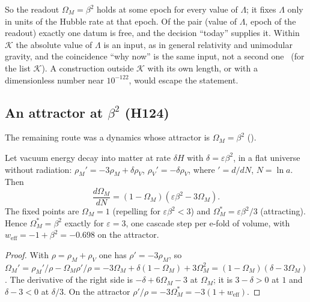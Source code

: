 So the readout $\Omega_M=\beta^2$ holds at some epoch for every value of $\Lambda$; it fixes $\Lambda$ only in units of the Hubble rate at that
epoch.  Of the pair (value of $\Lambda$, epoch of the readout) exactly one datum is free, and the decision ``today'' supplies it.  Within $\mathcal K$
the absolute value of $\Lambda$ is an input, as in general relativity and unimodular gravity, and the coincidence ``why now'' is the same input, not
a second one \Established\ (for the list $\mathcal K$).  A construction outside $\mathcal K$ with its own length, or with a dimensionless number near
$10^{-122}$, would escape the statement.

\subsection{An attractor at \texorpdfstring{$\beta^2$}{beta squared} (H124)}
\label{sec:lop5-attractor}

The remaining route was a dynamics whose attractor is $\Omega_M=\beta^2$ ().

\begin{proposition}
\label{prop:lop5-attractor}
Let vacuum energy decay into matter at rate $\delta H$ with $\delta=\varepsilon\beta^2$, in a flat universe without radiation:
$\rho_M'=-3\rho_M+\delta\rho_V$, $\rho_V'=-\delta\rho_V$, where $'=d/dN$, $N=\ln a$.  Then
\begin{equation}
 \frac{d\Omega_M}{dN}=(1-\Omega_M)(\varepsilon\beta^2-3\Omega_M).
 \label{eq:lop5-flow}
\end{equation}
The fixed points are $\Omega_M=1$ (repelling for $\varepsilon\beta^2<3$) and $\Omega_M^*=\varepsilon\beta^2/3$ (attracting).  Hence
$\Omega_M^*=\beta^2$ exactly for $\varepsilon=3$, one cascade step per e-fold of volume, with $w_{\mathrm{eff}}=-1+\beta^2=-0.698$ on the attractor.
\end{proposition}

\begin{proof}
With $\rho=\rho_M+\rho_V$ one has $\rho'=-3\rho_M$, so
$\Omega_M'=\rho_M'/\rho-\Omega_M\rho'/\rho=-3\Omega_M+\delta(1-\Omega_M)+3\Omega_M^2=(1-\Omega_M)(\delta-3\Omega_M)$.  The derivative of the right side is
$-\delta+6\Omega_M-3$ at $\Omega_M$; it is $3-\delta>0$ at $1$ and $\delta-3<0$ at $\delta/3$.  On the attractor $\rho'/\rho=-3\Omega_M^*=-3(1+w_{\mathrm{eff}})$.
\end{proof}

